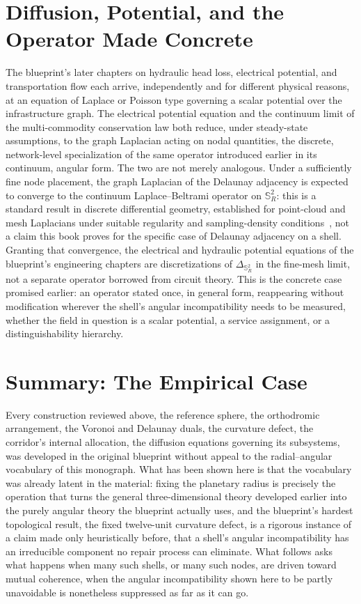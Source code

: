 \documentclass[11pt,fleqn]{book}
\numberwithin{equation}{chapter}
\theoremstyle{plain}
\theoremstyle{definition}
\theoremstyle{remark}
\newcommand{\Sphere}{\mathbb{S}^{2}}
\begin{document}
\section{Diffusion, Potential, and the Operator Made Concrete}

The blueprint's later chapters on hydraulic head loss, electrical potential, and transportation flow each arrive, independently and for different physical reasons, at an equation of Laplace or Poisson type governing a scalar potential over the infrastructure graph. The electrical potential equation and the continuum limit of the multi-commodity conservation law both reduce, under steady-state assumptions, to the graph Laplacian acting on nodal quantities, the discrete, network-level specialization of the same operator introduced earlier in its continuum, angular form. The two are not merely analogous. Under a sufficiently fine node placement, the graph Laplacian of the Delaunay adjacency is expected to converge to the continuum Laplace--Beltrami operator on \(\Sphere_R\): this is a standard result in discrete differential geometry, established for point-cloud and mesh Laplacians under suitable regularity and sampling-density conditions~\cite{belkinniyogi2008}, not a claim this book proves for the specific case of Delaunay adjacency on a shell. Granting that convergence, the electrical and hydraulic potential equations of the blueprint's engineering chapters are discretizations of \(\Delta_{\Sphere_R}\) in the fine-mesh limit, not a separate operator borrowed from circuit theory. This is the concrete case promised earlier: an operator stated once, in general form, reappearing without modification wherever the shell's angular incompatibility needs to be measured, whether the field in question is a scalar potential, a service assignment, or a distinguishability hierarchy.

\section{Summary: The Empirical Case}

Every construction reviewed above, the reference sphere, the orthodromic arrangement, the Voronoi and Delaunay duals, the curvature defect, the corridor's internal allocation, the diffusion equations governing its subsystems, was developed in the original blueprint without appeal to the radial--angular vocabulary of this monograph. What has been shown here is that the vocabulary was already latent in the material: fixing the planetary radius is precisely the operation that turns the general three-dimensional theory developed earlier into the purely angular theory the blueprint actually uses, and the blueprint's hardest topological result, the fixed twelve-unit curvature defect, is a rigorous instance of a claim made only heuristically before, that a shell's angular incompatibility has an irreducible component no repair process can eliminate. What follows asks what happens when many such shells, or many such nodes, are driven toward mutual coherence, when the angular incompatibility shown here to be partly unavoidable is nonetheless suppressed as far as it can go.
\end{document}
